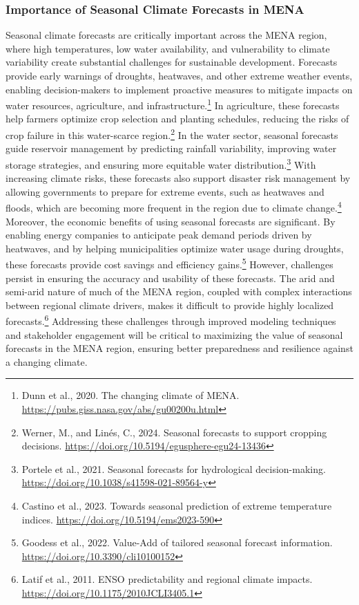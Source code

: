 \subsubsection{Importance of Seasonal Climate Forecasts in MENA}
Seasonal climate forecasts are critically important across the MENA region, where high temperatures, low water availability, and vulnerability to climate variability create substantial challenges for sustainable development. Forecasts provide early warnings of droughts, heatwaves, and other extreme weather events, enabling decision-makers to implement proactive measures to mitigate impacts on water resources, agriculture, and infrastructure.\footnote{Dunn et al., 2020. The changing climate of MENA. \url{https://pubs.giss.nasa.gov/abs/gu00200u.html}} In agriculture, these forecasts help farmers optimize crop selection and planting schedules, reducing the risks of crop failure in this water-scarce region.\footnote{Werner, M., and Linés, C., 2024. Seasonal forecasts to support cropping decisions. \url{https://doi.org/10.5194/egusphere-egu24-13436}} In the water sector, seasonal forecasts guide reservoir management by predicting rainfall variability, improving water storage strategies, and ensuring more equitable water distribution.\footnote{Portele et al., 2021. Seasonal forecasts for hydrological decision-making. \url{https://doi.org/10.1038/s41598-021-89564-y}} With increasing climate risks, these forecasts also support disaster risk management by allowing governments to prepare for extreme events, such as heatwaves and floods, which are becoming more frequent in the region due to climate change.\footnote{Castino et al., 2023. Towards seasonal prediction of extreme temperature indices. \url{https://doi.org/10.5194/ems2023-590}} Moreover, the economic benefits of using seasonal forecasts are significant. By enabling energy companies to anticipate peak demand periods driven by heatwaves, and by helping municipalities optimize water usage during droughts, these forecasts provide cost savings and efficiency gains.\footnote{Goodess et al., 2022. Value-Add of tailored seasonal forecast information. \url{https://doi.org/10.3390/cli10100152}} However, challenges persist in ensuring the accuracy and usability of these forecasts. The arid and semi-arid nature of much of the MENA region, coupled with complex interactions between regional climate drivers, makes it difficult to provide highly localized forecasts.\footnote{Latif et al., 2011. ENSO predictability and regional climate impacts. \url{https://doi.org/10.1175/2010JCLI3405.1}} Addressing these challenges through improved modeling techniques and stakeholder engagement will be critical to maximizing the value of seasonal forecasts in the MENA region, ensuring better preparedness and resilience against a changing climate.


